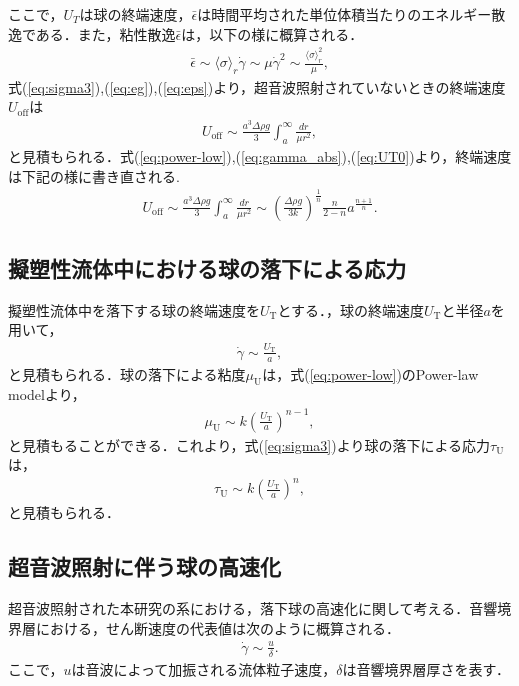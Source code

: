 ここで，$U_T$は球の終端速度，$\bar{\epsilon}$は時間平均された単位体積当たりのエネルギー散逸である．また，粘性散逸$\bar{\epsilon}$は，以下の様に概算される．
\begin{eqnarray}
    \bar{\epsilon} \sim \langle\sigma\rangle_r\dot{\gamma} \sim \mu \dot{\gamma}^2 \sim \frac{\langle\sigma\rangle_r^2}{\mu} ,
    \label{eq:eps}
\end{eqnarray}
式(\ref{eq:sigma3}),(\ref{eq:eg}),(\ref{eq:eps})より，超音波照射されていないときの終端速度$U_\text{off}$は
\begin{eqnarray}
    U_\text{off} \sim \frac{a^3\Delta\rho g}{3}\int_a^\infty\frac{dr}{\mu r^2} ,
    \label{eq:UT0}
\end{eqnarray}
と見積もられる．式(\ref{eq:power-low}),(\ref{eq:gamma_abs}),(\ref{eq:UT0})より，終端速度は下記の様に書き直される.
\begin{eqnarray}
    U_\text{off} \sim \frac{a^3\Delta\rho g}{3}  \int^{\infty}_{a} \frac{dr}{\mu r^2} \sim \left(\frac{\Delta \rho g}{3k}\right)^{\frac{1}{n}}\frac{n}{2-n}a^{\frac{n+1}{n}} .
    \label{eq:UT}
\end{eqnarray}

\subsection{擬塑性流体中における球の落下による応力}
擬塑性流体中を落下する球の終端速度を$U_\text{T}$とする．，球の終端速度$U_\text{T}$と半径$a$を用いて，
\begin{eqnarray}
    \dot{\gamma} \sim \frac{U_\text{T}}{a},
    \label{eq:UTgamma}
\end{eqnarray}
と見積もられる．球の落下による粘度$\mu_\text{U}$は，式(\ref{eq:power-low})のPower-law modelより，
\begin{eqnarray}
    \mu_\text{U} \sim k \left(\frac{U_\text{T}}{a}\right)^{n-1} ,
    \label{eq:muU}
\end{eqnarray}
と見積もることができる．これより，式(\ref{eq:sigma3})より球の落下による応力$\tau_\text{U}$は，
\begin{eqnarray}
    \tau_\text{U} \sim k \left(\frac{U_\text{T}}{a}\right)^n ,
    \label{eq:tauU}
\end{eqnarray}
と見積もられる．

\subsection{超音波照射に伴う球の高速化}
\label{sec:UTdiff}
超音波照射された本研究の系における，落下球の高速化に関して考える．音響境界層における，せん断速度の代表値は次のように概算される．
\begin{eqnarray}
    \dot{\gamma} \sim \frac{u}{\delta} .
    \label{eq:abl-delta}
\end{eqnarray}
ここで，$u$は音波によって加振される流体粒子速度，$\delta$は音響境界層厚さを表す．

